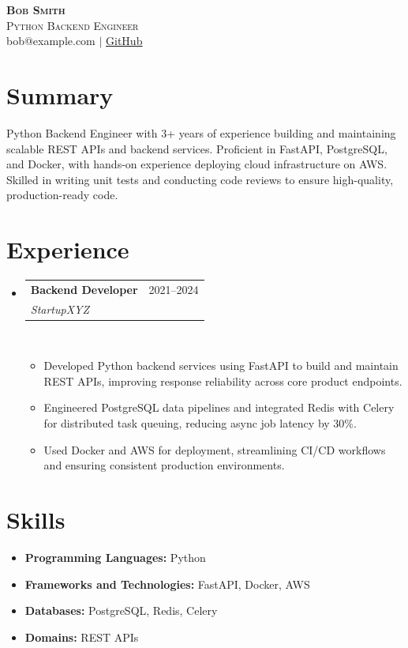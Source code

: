 \documentclass[letterpaper,11pt]{article}
\newcommand{\resumeItem}[1]{\item\small{{#1 \vspace{-3pt}}}}
\newcommand{\resumeSubheading}[4]{
  \vspace{-3pt}\item
    \begin{tabularx}{0.995\textwidth}[t]{Xr}
      \textbf{#1} & #2 \\
      \textit{\small#3} & \textit{\small #4} \\
    \end{tabularx}\\[-3pt]
    \vspace{3pt}
}
\newcommand{\resumeItemListStart}{\begin{itemize}}
\newcommand{\resumeItemListEnd}{\end{itemize}\vspace{-4pt}}
\newcommand{\resumeSubHeadingListStart}{
  \begin{itemize}[leftmargin=0.12in, label={}]
  \setlength{\itemsep}{0pt}
  \setlength{\parsep}{0pt}
  \setlength{\parskip}{0pt}
}
\newcommand{\resumeSubHeadingListEnd}{\end{itemize}}
\begin{document}
\begin{center}
  \textbf{\LARGE \scshape Bob Smith} \\ \vspace{1pt}
  \small\textsc{Python Backend Engineer} \\ \vspace{1pt}
  \small{bob@example.com $|$ \href{https://github.com/bobsmith}{\underline{GitHub}}} \\
\end{center}

\vspace{10pt}

\section{Summary}
\vspace{-4pt}
\small{Python Backend Engineer with 3+ years of experience building and maintaining scalable REST APIs and backend services. Proficient in FastAPI, PostgreSQL, and Docker, with hands-on experience deploying cloud infrastructure on AWS. Skilled in writing unit tests and conducting code reviews to ensure high-quality, production-ready code.}
\vspace{2pt}

\section{Experience}
\vspace{-4pt}
\resumeSubHeadingListStart
\resumeSubheading
{Backend Developer}{2021--2024}
{StartupXYZ}{}
\resumeItemListStart
\resumeItem{Developed Python backend services using FastAPI to build and maintain REST APIs, improving response reliability across core product endpoints.}
\resumeItem{Engineered PostgreSQL data pipelines and integrated Redis with Celery for distributed task queuing, reducing async job latency by 30\%.}
\resumeItem{Used Docker and AWS for deployment, streamlining CI/CD workflows and ensuring consistent production environments.}
\resumeItemListEnd
\resumeSubHeadingListEnd

\section{Skills}
\vspace{-4pt}
\begin{itemize}[leftmargin=0in, label={}, itemsep=1pt, topsep=2pt, parsep=0pt]
  \item \small{\textbf{Programming Languages:} Python}
  \item \small{\textbf{Frameworks and Technologies:} FastAPI, Docker, AWS}
  \item \small{\textbf{Databases:} PostgreSQL, Redis, Celery}
  \item \small{\textbf{Domains:} REST APIs}
\end{itemize}
\end{document}
